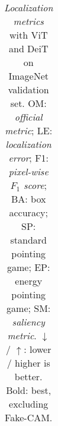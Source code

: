 \begin{table}[t]
\begin{tabular}{lrrr|rrrr|rrr|rrrr}
\bottomrule
\end{tabular}
\vspace{5pt}
\caption{\emph{Localization metrics} with ViT and DeiT on ImageNet validation set. OM: \emph{official metric}; LE: \emph{localization error}; F1: \emph{pixel-wise $F_1$ score}; BA: box accuracy;
SP: standard pointing game; EP: energy pointing game; SM: \emph{saliency metric}.
$\downarrow$ / $\uparrow$: lower / higher is better. Bold: best, excluding Fake-CAM.}
\label{tab:ablate-loc-sup-deit}
\end{table}
